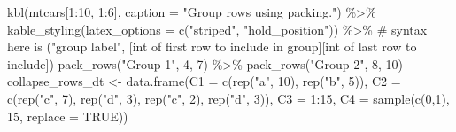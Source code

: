 \documentclass[
  letterpaper,
  DIV=11,
  numbers=noendperiod]{scrartcl}
\newenvironment{Shaded}{\begin{snugshade}}{\end{snugshade}}
\newcommand{\AttributeTok}[1]{\textcolor[rgb]{0.40,0.45,0.13}{#1}}
\newcommand{\CommentTok}[1]{\textcolor[rgb]{0.37,0.37,0.37}{#1}}
\newcommand{\ConstantTok}[1]{\textcolor[rgb]{0.56,0.35,0.01}{#1}}
\newcommand{\DecValTok}[1]{\textcolor[rgb]{0.68,0.00,0.00}{#1}}
\newcommand{\FunctionTok}[1]{\textcolor[rgb]{0.28,0.35,0.67}{#1}}
\newcommand{\NormalTok}[1]{\textcolor[rgb]{0.00,0.23,0.31}{#1}}
\newcommand{\OtherTok}[1]{\textcolor[rgb]{0.00,0.23,0.31}{#1}}
\newcommand{\SpecialCharTok}[1]{\textcolor[rgb]{0.37,0.37,0.37}{#1}}
\newcommand{\StringTok}[1]{\textcolor[rgb]{0.13,0.47,0.30}{#1}}
\begin{document}
\begin{Shaded}
\begin{Highlighting}[]
\FunctionTok{kbl}\NormalTok{(mtcars[}\DecValTok{1}\SpecialCharTok{:}\DecValTok{10}\NormalTok{, }\DecValTok{1}\SpecialCharTok{:}\DecValTok{6}\NormalTok{], }
    \AttributeTok{caption =} \StringTok{"Group rows using packing."}\NormalTok{) }\SpecialCharTok{\%\textgreater{}\%}
  \FunctionTok{kable\_styling}\NormalTok{(}\AttributeTok{latex\_options =} \FunctionTok{c}\NormalTok{(}\StringTok{"striped"}\NormalTok{, }\StringTok{"hold\_position"}\NormalTok{)) }\SpecialCharTok{\%\textgreater{}\%} 
  \CommentTok{\# syntax here is ("group label", [int of first row to include in group][int of last row to include])}
  \FunctionTok{pack\_rows}\NormalTok{(}\StringTok{"Group 1"}\NormalTok{, }\DecValTok{4}\NormalTok{, }\DecValTok{7}\NormalTok{) }\SpecialCharTok{\%\textgreater{}\%}
  \FunctionTok{pack\_rows}\NormalTok{(}\StringTok{"Group 2"}\NormalTok{, }\DecValTok{8}\NormalTok{, }\DecValTok{10}\NormalTok{)}
\NormalTok{collapse\_rows\_dt }\OtherTok{\textless{}{-}} \FunctionTok{data.frame}\NormalTok{(}\AttributeTok{C1 =} \FunctionTok{c}\NormalTok{(}\FunctionTok{rep}\NormalTok{(}\StringTok{"a"}\NormalTok{, }\DecValTok{10}\NormalTok{), }\FunctionTok{rep}\NormalTok{(}\StringTok{"b"}\NormalTok{, }\DecValTok{5}\NormalTok{)),}
                               \AttributeTok{C2 =} \FunctionTok{c}\NormalTok{(}\FunctionTok{rep}\NormalTok{(}\StringTok{"c"}\NormalTok{, }\DecValTok{7}\NormalTok{), }\FunctionTok{rep}\NormalTok{(}\StringTok{"d"}\NormalTok{, }\DecValTok{3}\NormalTok{), }\FunctionTok{rep}\NormalTok{(}\StringTok{"c"}\NormalTok{, }\DecValTok{2}\NormalTok{), }\FunctionTok{rep}\NormalTok{(}\StringTok{"d"}\NormalTok{, }\DecValTok{3}\NormalTok{)),}
                               \AttributeTok{C3 =} \DecValTok{1}\SpecialCharTok{:}\DecValTok{15}\NormalTok{,}
                               \AttributeTok{C4 =} \FunctionTok{sample}\NormalTok{(}\FunctionTok{c}\NormalTok{(}\DecValTok{0}\NormalTok{,}\DecValTok{1}\NormalTok{), }\DecValTok{15}\NormalTok{, }\AttributeTok{replace =} \ConstantTok{TRUE}\NormalTok{))}
\end{Highlighting}
\end{Shaded}
\end{document}
